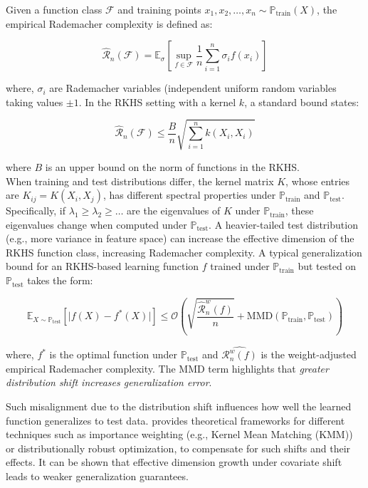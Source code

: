 \begin{enumerate}
    Given a function class $\mathcal{F}$ and training points $x_1, x_2, \ldots, x_n \sim \mathbb{P}_{\text{train}}(X)$, the empirical Rademacher complexity is defined as:

    \begin{equation}
        \hat{\mathcal{R}}_n(\mathcal{F}) = \mathbb{E}_{\sigma} \left[ \sup_{f \in \mathcal{F}} \frac{1}{n} \sum_{i=1}^{n}\sigma_i f(x_i)\right]
        \label{eqn:2.6}
    \end{equation}
    
    where, $\sigma_i$ are Rademacher variables (independent uniform random variables taking values $\pm 1$. In the RKHS setting with a kernel $k$, a standard bound \citep{mohri2018foundations} states:

    \begin{equation}
        \hat{\mathcal{R}}_n(\mathcal{F}) \leq \frac{B}{n} \sqrt{\sum_{i=1}^{n} k(X_i, X_i)}
        \label{eqn:2.7}
    \end{equation}
    
    where $B$ is an upper bound on the norm of functions in the RKHS.\\

    When training and test distributions differ, the kernel matrix $K$, whose entries are $K_{ij} = K(X_i, X_j)$, has different spectral properties under $\mathbb{P}_{\text{train}}$ and $\mathbb{P}_{\text{test}}$. Specifically, if $\lambda_1 \geq \lambda_2 \geq \ldots$ are the eigenvalues of $K$ under $\mathbb{P}_{\text{train}}$, these eigenvalues change when computed under $\mathbb{P}_{\text{test}}$. A heavier-tailed test distribution (e.g., more variance in feature space) can increase the effective dimension of the RKHS function class, increasing Rademacher complexity. A typical generalization bound for an RKHS-based learning function $f$ trained under $\mathbb{P}_{\text{train}}$ but tested on $\mathbb{P}_{\text{test}}$ takes the form:

    \begin{equation}
        \mathbb{E}_{X \sim \mathbb{P}_{\text{test}}}[\lvert f(X) - f^*(X)\rvert] \leq \mathcal{O} \left( \sqrt{\frac{\hat{\mathcal{R}}_n^w(f)}{n}} + \text{MMD}(\mathbb{P}_{\text{train}}, \mathbb{P}_{\text{test}}) \right)
        \label{eqn:2.8}
    \end{equation}
    
    where, $f^*$ is the optimal function under $\mathbb{P}_{\text{test}}$ and $\hat{\mathcal{R}_n^w(f)}$ is the weight-adjusted empirical Rademacher complexity. The MMD term highlights that \emph{greater distribution shift increases generalization error}.\\

\end{enumerate}

Such misalignment due to the distribution shift influences how well the learned function generalizes to test data. \citep{mohri2018foundations} provides theoretical frameworks for different techniques such as importance weighting (e.g., Kernel Mean Matching (KMM)) or distributionally robust optimization, to compensate for such shifts and their effects. It can be shown that effective dimension growth under covariate shift leads to weaker generalization guarantees.
